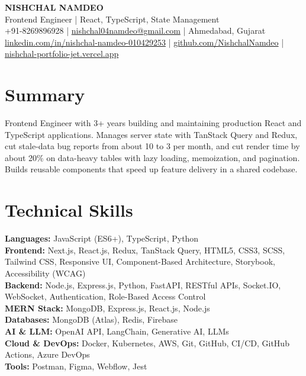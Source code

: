 \documentclass[a4paper,10pt]{article}
\begin{document}
\begin{center}
  {\LARGE \textbf{NISHCHAL NAMDEO}}\\[3pt]
  Frontend Engineer | React, TypeScript, State Management\\[3pt]
  +91-8269896928 | \href{mailto:nishchal04namdeo@gmail.com}{nishchal04namdeo@gmail.com} | Ahmedabad, Gujarat\\[2pt]
  \href{https://www.linkedin.com/in/nishchal-namdeo-010429253/}{linkedin.com/in/nishchal-namdeo-010429253} |
  \href{https://github.com/NishchalNamdeo}{github.com/NishchalNamdeo} |
  \href{https://nishchal-portfolio-jet.vercel.app/}{nishchal-portfolio-jet.vercel.app}
\end{center}

\section{Summary}
Frontend Engineer with 3+ years building and maintaining production React and TypeScript applications. Manages server state with TanStack Query and Redux, cut stale-data bug reports from about 10 to 3 per month, and cut render time by about 20\% on data-heavy tables with lazy loading, memoization, and pagination. Builds reusable components that speed up feature delivery in a shared codebase.

\section{Technical Skills}
\textbf{Languages:} JavaScript (ES6+), TypeScript, Python\\
\textbf{Frontend:} Next.js, React.js, Redux, TanStack Query, HTML5, CSS3, SCSS, Tailwind CSS, Responsive UI, Component-Based Architecture, Storybook, Accessibility (WCAG)\\
\textbf{Backend:} Node.js, Express.js, Python, FastAPI, RESTful APIs, Socket.IO, WebSocket, Authentication, Role-Based Access Control\\
\textbf{MERN Stack:} MongoDB, Express.js, React.js, Node.js\\
\textbf{Databases:} MongoDB (Atlas), Redis, Firebase\\
\textbf{AI \& LLM:} OpenAI API, LangChain, Generative AI, LLMs\\
\textbf{Cloud \& DevOps:} Docker, Kubernetes, AWS, Git, GitHub, CI/CD, GitHub Actions, Azure DevOps\\
\textbf{Tools:} Postman, Figma, Webflow, Jest
\end{document}

